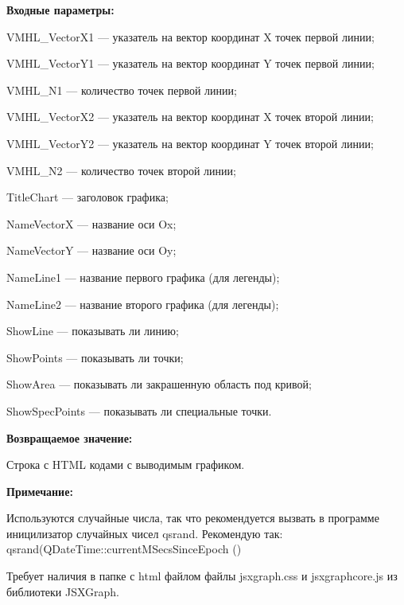 \textbf{Входные параметры:}
 
    VMHL\_VectorX1 --- указатель на вектор координат X точек первой линии;
 
    VMHL\_VectorY1 --- указатель на вектор координат Y точек первой линии;
 
    VMHL\_N1 --- количество точек первой линии;
 
    VMHL\_VectorX2 --- указатель на вектор координат X точек второй линии;
 
    VMHL\_VectorY2 --- указатель на вектор координат Y точек второй линии;
 
    VMHL\_N2 --- количество точек второй линии;
 
    TitleChart --- заголовок графика;
 
    NameVectorX --- название оси Ox;
 
    NameVectorY --- название оси Oy;
 
    NameLine1 --- название первого графика (для легенды);
 
    NameLine2 --- название второго графика (для легенды);
 
    ShowLine --- показывать ли линию;
 
    ShowPoints --- показывать ли точки;
 
    ShowArea --- показывать ли закрашенную область под кривой;
 
    ShowSpecPoints --- показывать ли специальные точки.

\textbf{Возвращаемое значение:}

Строка с HTML кодами с выводимым графиком.

\textbf{Примечание:}

Используются случайные числа, так что рекомендуется вызвать в программе иницилизатор случайных чисел qsrand. Рекомендую так: qsrand(QDateTime::currentMSecsSinceEpoch () %

Требует наличия в папке с html файлом файлы jsxgraph.css и jsxgraphcore.js из библиотеки JSXGraph.